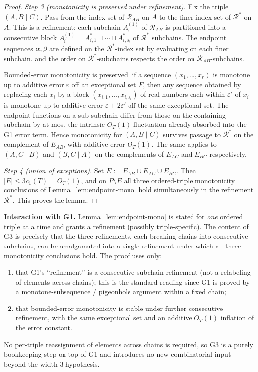 \begin{proof}
\smallskip
\noindent\emph{Step 3 (monotonicity is preserved under refinement).}
Fix the triple $(A, B \mid C)$. Pass from the index set of
$\mathcal R_{AB}$ on $A$ to the finer index set of $\mathcal R^*$ on $A$.
This is a refinement: each subchain $A_i^{(1)}$ of $\mathcal R_{AB}$ is
partitioned into a consecutive block
$A_i^{(1)} = A_{i,1}^* \sqcup \cdots \sqcup A_{i,s_i}^*$ of $\mathcal R^*$
subchains. The endpoint sequences $\alpha, \beta$ are defined on the
$\mathcal R^*$-index set by evaluating on each finer subchain, and the
order on $\mathcal R^*$-subchains respects the order on
$\mathcal R_{AB}$-subchains.

Bounded-error monotonicity is preserved: if a sequence
$(x_1, \ldots, x_r)$ is monotone up to additive error $\varepsilon$ off
an exceptional set $F$, then any sequence obtained by replacing each
$x_i$ by a block $(x_{i,1}, \ldots, x_{i,s_i})$ of real numbers each
within $\varepsilon'$ of $x_i$ is monotone up to additive error
$\varepsilon + 2\varepsilon'$ off the same exceptional set. The endpoint
functions on a sub-subchain differ from those on the containing subchain
by at most the intrinsic $O_T(1)$ fluctuation already absorbed into the
G1 error term. Hence monotonicity for $(A, B \mid C)$ survives passage
to $\mathcal R^*$ on the complement of $E_{AB}$, with additive error
$O_T(1)$. The same applies to $(A, C \mid B)$ and $(B, C \mid A)$ on
the complements of $E_{AC}$ and $E_{BC}$ respectively.

\smallskip
\noindent\emph{Step 4 (union of exceptions).} Set
$E := E_{AB} \cup E_{AC} \cup E_{BC}$. Then $|E| \le 3 c_1(T) = O_T(1)$,
and on $P \setminus E$ all three ordered-triple monotonicity conclusions
of Lemma~\ref{lem:endpoint-mono} hold simultaneously in the refinement
$\mathcal R^*$. This proves the lemma.
\end{proof}

\noindent\textbf{Interaction with G1.} Lemma~\ref{lem:endpoint-mono} is
stated for \emph{one} ordered triple at a time and grants a refinement
(possibly triple-specific). The content of G3 is precisely that the
three refinements, each breaking chains into consecutive subchains, can
be amalgamated into a single refinement under which all three
monotonicity conclusions hold. The proof uses only:
\begin{enumerate}[label=(\alph*),nosep]
  \item that G1's ``refinement'' is a consecutive-subchain refinement
    (not a relabeling of elements across chains); this is the standard
    reading since G1 is proved by a monotone-subsequence / pigeonhole
    argument within a fixed chain;
  \item that bounded-error monotonicity is stable under further
    consecutive refinement, with the same exceptional set and an
    additive $O_T(1)$ inflation of the error constant.
\end{enumerate}
No per-triple reassignment of elements across chains is required, so G3
is a purely bookkeeping step on top of G1 and introduces no new
combinatorial input beyond the width-$3$ hypothesis.


